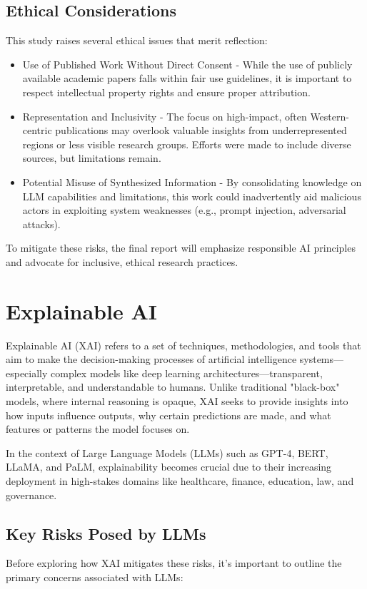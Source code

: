 \documentclass[conference]{IEEEtran}
\begin{document}
\subsection{Ethical Considerations} \cite{rudin2019}
This study raises several ethical issues that merit reflection:
\begin{itemize}
    \item Use of Published Work Without Direct Consent - While the use of publicly available academic papers falls within fair use guidelines, it is important to respect intellectual property rights and ensure proper attribution.
    \item Representation and Inclusivity - The focus on high-impact, often Western-centric publications may overlook valuable insights from underrepresented regions or less visible research groups. Efforts were made to include diverse sources, but limitations remain.
    \item Potential Misuse of Synthesized Information - By consolidating knowledge on LLM capabilities and limitations, this work could inadvertently aid malicious actors in exploiting system weaknesses (e.g., prompt injection, adversarial attacks).

\end{itemize}
To mitigate these risks, the final report will emphasize responsible AI principles and advocate for inclusive, ethical research practices.

\section{Explainable AI}
Explainable AI (XAI) refers to a set of techniques, methodologies, and tools that aim to make the decision-making processes of artificial intelligence systems—especially complex models like deep learning architectures—transparent, interpretable, and understandable to humans. Unlike traditional "black-box" models, where internal reasoning is opaque, XAI seeks to provide insights into how inputs influence outputs, why certain predictions are made, and what features or patterns the model focuses on.

In the context of Large Language Models (LLMs) such as GPT-4, BERT, LLaMA, and PaLM, explainability becomes crucial due to their increasing deployment in high-stakes domains like healthcare, finance, education, law, and governance.

\subsection{Key Risks Posed by LLMs}
Before exploring how XAI mitigates these risks, it's important to outline the primary concerns associated with LLMs:
\end{document}
